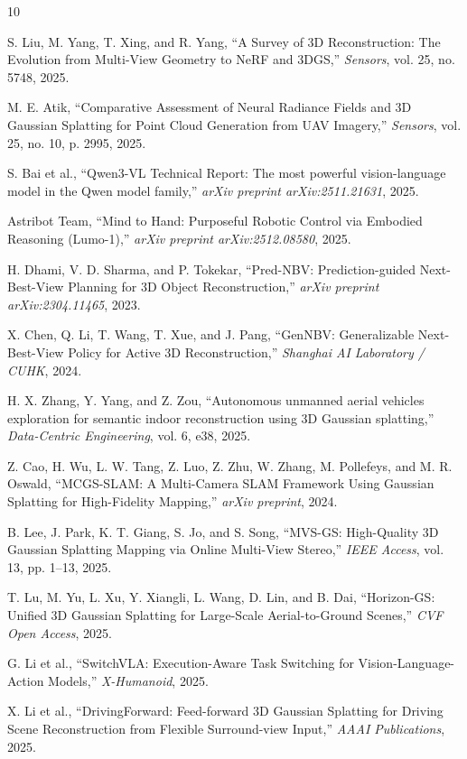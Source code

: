 \documentclass[12pt,a4paper]{article}
\begin{document}
	\begin{thebibliography}{10}
		
		S. Liu, M. Yang, T. Xing, and R. Yang, ``A Survey of 3D Reconstruction: The Evolution from Multi-View Geometry to NeRF and 3DGS,'' \textit{Sensors}, vol. 25, no. 5748, 2025.
		
		M. E. Atik, ``Comparative Assessment of Neural Radiance Fields and 3D Gaussian Splatting for Point Cloud Generation from UAV Imagery,'' \textit{Sensors}, vol. 25, no. 10, p. 2995, 2025.
		
		S. Bai et al., ``Qwen3-VL Technical Report: The most powerful vision-language model in the Qwen model family,'' \textit{arXiv preprint arXiv:2511.21631}, 2025.
		
		Astribot Team, ``Mind to Hand: Purposeful Robotic Control via Embodied Reasoning (Lumo-1),'' \textit{arXiv preprint arXiv:2512.08580}, 2025.
		
		H. Dhami, V. D. Sharma, and P. Tokekar, ``Pred-NBV: Prediction-guided Next-Best-View Planning for 3D Object Reconstruction,'' \textit{arXiv preprint arXiv:2304.11465}, 2023.
		
		X. Chen, Q. Li, T. Wang, T. Xue, and J. Pang, ``GenNBV: Generalizable Next-Best-View Policy for Active 3D Reconstruction,'' \textit{Shanghai AI Laboratory / CUHK}, 2024.
		
		H. X. Zhang, Y. Yang, and Z. Zou, ``Autonomous unmanned aerial vehicles exploration for semantic indoor reconstruction using 3D Gaussian splatting,'' \textit{Data-Centric Engineering}, vol. 6, e38, 2025.
		
		Z. Cao, H. Wu, L. W. Tang, Z. Luo, Z. Zhu, W. Zhang, M. Pollefeys, and M. R. Oswald, ``MCGS-SLAM: A Multi-Camera SLAM Framework Using Gaussian Splatting for High-Fidelity Mapping,'' \textit{arXiv preprint}, 2024.
		
		B. Lee, J. Park, K. T. Giang, S. Jo, and S. Song, ``MVS-GS: High-Quality 3D Gaussian Splatting Mapping via Online Multi-View Stereo,'' \textit{IEEE Access}, vol. 13, pp. 1--13, 2025.
		
		T. Lu, M. Yu, L. Xu, Y. Xiangli, L. Wang, D. Lin, and B. Dai, ``Horizon-GS: Unified 3D Gaussian Splatting for Large-Scale Aerial-to-Ground Scenes,'' \textit{CVF Open Access}, 2025.
		
		G. Li et al., ``SwitchVLA: Execution-Aware Task Switching for Vision-Language-Action Models,'' \textit{X-Humanoid}, 2025.
		
		X. Li et al., ``DrivingForward: Feed-forward 3D Gaussian Splatting for Driving Scene Reconstruction from Flexible Surround-view Input,'' \textit{AAAI Publications}, 2025.
		
	\end{thebibliography}
	
\end{document}
